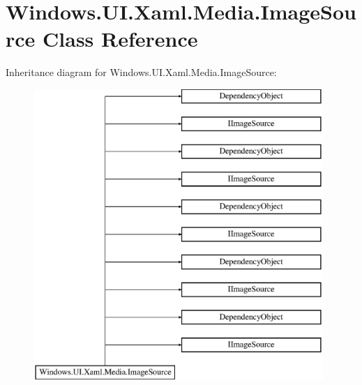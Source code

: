 \hypertarget{class_windows_1_1_u_i_1_1_xaml_1_1_media_1_1_image_source}{}\section{Windows.\+U\+I.\+Xaml.\+Media.\+Image\+Source Class Reference}
\label{class_windows_1_1_u_i_1_1_xaml_1_1_media_1_1_image_source}
Inheritance diagram for Windows.\+U\+I.\+Xaml.\+Media.\+Image\+Source\+:\begin{figure}[H]
\begin{center}
\leavevmode
\includegraphics[height=11.000000cm]{class_windows_1_1_u_i_1_1_xaml_1_1_media_1_1_image_source}
\end{center}
\end{figure}
